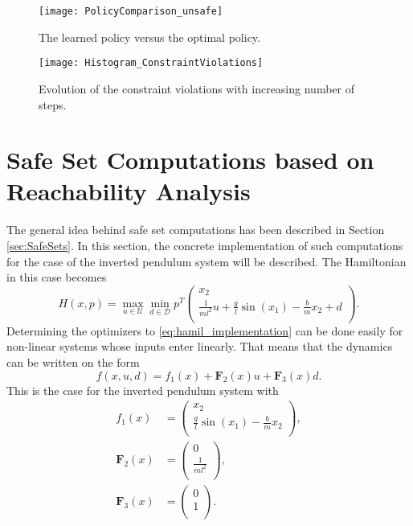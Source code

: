 \documentclass[../main.tex]{subfiles}
\begin{document}
\begin{figure}[H]
    \centering
    \texttt{[image: PolicyComparison\_unsafe]}
        \caption{The learned policy versus the optimal policy.}    
    \label{fig:PolicyComparison_unsafe}
\end{figure}
\begin{figure}[H]
    \centering
    \texttt{[image: Histogram\_ConstraintViolations]}
        \caption{Evolution of the constraint violations with increasing number of steps.}    
    \label{fig:Histogram_ConstraintViolations}
\end{figure}

\section{Safe Set Computations based on Reachability Analysis}
The general idea behind safe set computations has been described in Section \ref{sec:SafeSets}. In this section, the concrete implementation of such computations for the case of the inverted pendulum system will be described. The Hamiltonian in this case becomes 
\begin{equation}\label{eq:hamil_implementation}
    H(x,p) = \max_{u \in \mathcal{U}} \min_{d \in \mathcal{D}} p^T 
\left(
\begin{array}{c}
x_2\\
\frac{1}{ml^2}u+\frac{g}{l}\sin(x_1)-\frac{b}{m}x_2+d\\
\end{array}
\right).
\end{equation}
Determining the optimizers to \eqref{eq:hamil_implementation} can be done easily for non-linear systems whose inputs enter linearly. That means that the dynamics can be written on the form
\begin{equation}
    f(x,u,d) = f_1(x)+\textbf{F}_2(x)u+\textbf{F}_3(x)d.
\end{equation}
This is the case for the inverted pendulum system with
\begin{align}
    f_1(x) &= \left(
\begin{array}{c}
x_2\\
\frac{g}{l}\sin(x_1)-\frac{b}{m}x_2\\
\end{array}
\right),\\
    \textbf{F}_2(x) &= \left(
\begin{array}{c}
0\\
\frac{1}{ml^2}\\
\end{array}
\right),\\
    \textbf{F}_3(x) &= \left(
    \begin{array}{c}
0\\
1\\
\end{array}
\right).
\end{align}
\end{document}
